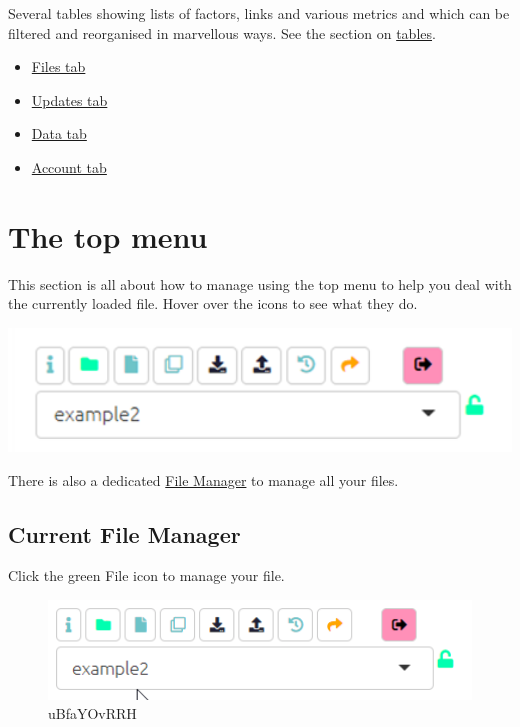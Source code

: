 \documentclass[
]{book}
\begin{document}
Several tables showing lists of factors, links and various metrics and which can be filtered and reorganised in marvellous ways. See the section on \href{https://guide.causalmap.app/all-the-tables.html}{tables}.

\begin{itemize}
\item
  \protect\hyperlink{xfile-manager}{Files tab}
\item
  \protect\hyperlink{xupdates-tab}{Updates tab}
\item
  \protect\hyperlink{xdata-manager}{Data tab}
\item
  \protect\hyperlink{account-tab}{Account tab}
\end{itemize}

\hypertarget{xtop-menu}{%
\chapter{The top menu}\label{xtop-menu}}

This section is all about how to manage using the top menu to help you deal with the currently loaded file. Hover over the icons to see what they do.

\includegraphics[width=6.77083in,height=\textheight]{_assets/image-20211025111815970.png}

There is also a dedicated \protect\hyperlink{file-manager}{File Manager} to manage all your files.

\hypertarget{xpermissions}{%
\section{Current File Manager}\label{xpermissions}}

Click the green File icon to manage your file.

\begin{figure}
\centering
\includegraphics[width=6.77083in,height=\textheight]{_assets/uBfaYOvRRH.gif}
\caption{uBfaYOvRRH}
\end{figure}
\end{document}
